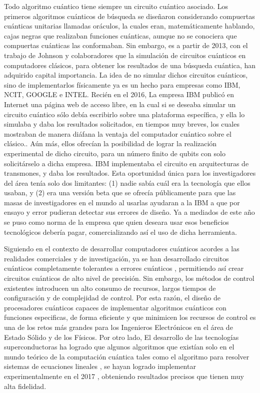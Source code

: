 Todo algoritmo cuántico tiene siempre un circuito cuántico asociado. Los primeros algoritmos cuánticos de búsqueda se diseñaron considerando compuertas cuánticas unitarias llamadas oráculos, la cuales eran, matemáticamente hablando, cajas negras que realizaban funciones cuánticas, aunque no se conociera que compuertas cuánticas las conformaban. Sin embargo, es a partir de 2013, con el trabajo de Johnson y colaboradores \cite{Johnson_2013} que la simulación de circuitos cuánticos en computadores clásicos, para obtener los resultados de una búsqueda cuántica, han adquirido capital importancia. La idea de no simular dichos circuitos cuánticos, sino de implementarlos físicamente ya es un hecho para empresas como IBM, NCIT, GOOGLE e INTEL. Recién en el 2016, La empresa IBM publicó en Internet una página web de acceso libre, en la cual si se deseaba simular un circuito cuántico sólo debía escribirlo sobre una plataforma específica, y ella lo simulaba y daba los resultados solicitados, en tiempos muy breves, los cuales mostraban de manera diáfana la ventaja del computador cuántico sobre el clásico.. Aún más, ellos ofrecían la posibilidad de lograr la realización experimental de dicho circuito, para un número finito de qubits con solo solicitárselo a dicha empresa. IBM implementaba el circuito en arquitecturas de transmones, y daba los resultados. Esta oportunidad única para los investigadores del área tenía solo dos limitantes: (1) nadie sabía cuál era la tecnología que ellos usaban, y (2) era una versión beta que se ofrecía públicamente para que las masas de investigadores en el mundo al usarlas ayudaran a la IBM a que por ensayo y error pudieran detectar sus errores de diseño. Ya a mediados de este año se puso como norma de la empresa que quien deseara usar esos beneficios tecnológicos debería pagar, comercializando así el uso de dicha herramienta.

Siguiendo en el contexto de desarrollar computadores cuánticos acordes a las realidades comerciales y de investigación, ya se han desarrollado circuitos cuánticos completamente tolerantes a errores cuánticos \cite{Paler_2017}, permitiendo así crear circuitos cuánticos de alto nivel de precisión. Sin embargo, los métodos de control existentes introducen un alto consumo de recursos, largos tiempos de configuración y de complejidad de control. Por esta razón, el diseño de procesadores cuánticos capaces de implementar algoritmos cuánticos con funciones especificas, de forma eficiente y que minimicen los recursos de control es una de los retos más grandes para los Ingenieros Electrónicos en el área de Estado Sólido y de los Físicos.  Por otro lado, El desarrollo de las tecnologías superconductoras ha logrado que algunos algoritmos que existían solo en el mundo teórico de la computación cuántica tales como el algoritmo para resolver sistemas de ecuaciones lineales \cite{Cao_2012}, se hayan logrado implementar experimentalmente en el 2017 \cite{Zheng_2017}, obteniendo resultados precisos que tienen muy alta fidelidad.

